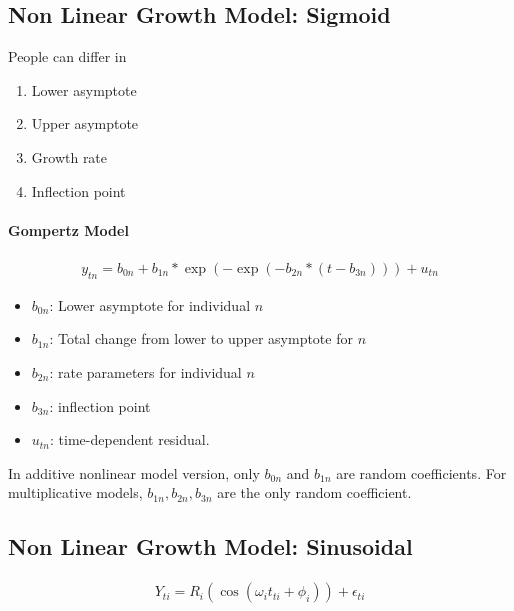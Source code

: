 \subsection{Non Linear Growth Model: Sigmoid} 
People can differ in 
    \begin{enumerate}
        \item Lower asymptote
        \item Upper asymptote 
        \item Growth rate
        \item Inflection point 
    \end{enumerate}
    
\paragraph{Gompertz Model} 
\begin{align*}
    y_{tn} = b_{0n} + b_{1n} * \exp(-\exp(-b_{2n} * (t-b_{3n}))) + u_{tn}
\end{align*}
    \begin{itemize}
        \item $b_{0n}$: Lower asymptote for individual $n$ 
        \item $b_{1n}$: Total change from lower to upper asymptote for $n$ 
        \item $b_{2n}$: rate parameters for individual $n$ 
        \item $b_{3n}$: inflection point 
        \item $u_{tn}$: time-dependent residual. 
    \end{itemize}
In additive nonlinear model version, only $b_{0n}$ and $b_{1n}$ are random coefficients. For multiplicative models, $b_{1n}, b_{2n}, b_{3n}$ are the only random coefficient. 


\subsection{Non Linear Growth Model: Sinusoidal} 
\begin{align*}
    Y_{ti} = R_i(\cos(\omega_i t_{ti} + \phi_i)) + \epsilon_{ti}
\end{align*}